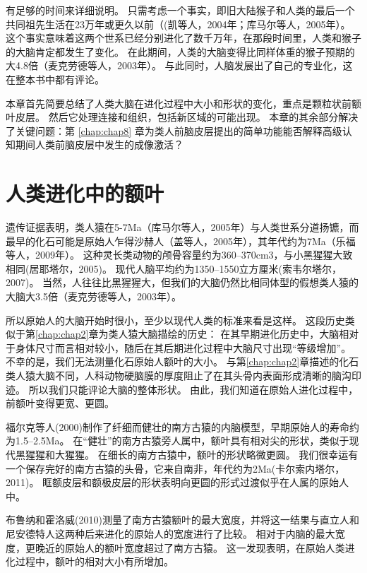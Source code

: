 有足够的时间来详细说明。
只需考虑一个事实，即旧大陆猴子和人类的最后一个共同祖先生活在23万年或更久以前（(凯等人，2004年；库马尔等人，2005年）。
这个事实意味着这两个世系已经分别进化了数千万年，在那段时间里，人类和猴子的大脑肯定都发生了变化。
在此期间，人类的大脑变得比同样体重的猴子预期的大4.8倍（麦克劳德等人，2003年）。
与此同时，人脑发展出了自己的专业化，这在整本书中都有评论。
\par


本章首先简要总结了人类大脑在进化过程中大小和形状的变化，重点是颗粒状前额叶皮层。
然后它处理连接和组织，包括新区域的可能出现。
本章的其余部分解决了关键问题：第 \ref{chap:chap8} 章为类人前脑皮层提出的简单功能能否解释高级认知期间人类前脑皮层中发生的成像激活？



\section{人类进化中的额叶}

遗传证据表明，类人猿在5-7Ma（库马尔等人，2005年）与人类世系分道扬镳，而最早的化石可能是原始人乍得沙赫人（盖等人，2005年），其年代约为7Ma（乐福等人，2009年）。
这种灵长类动物的颅骨容量约为360–370cm3，与小黑猩猩大致相同(居耶塔尔，2005)。
现代人脑平均约为1350–1550立方厘米(索韦尔塔尔，2007)。
当然，人往往比黑猩猩大，但我们的大脑仍然比相同体型的假想类人猿的大脑大3.5倍（麦克劳德等人，2003年）。
\par



所以原始人的大脑开始时很小，至少以现代人类的标准来看是这样。
这段历史类似于第\ref{chap:chap2}章为类人猿大脑描绘的历史：
在其早期进化历史中，大脑相对于身体尺寸而言相对较小，随后在其后期进化过程中大脑尺寸出现“等级增加”。
不幸的是，我们无法测量化石原始人额叶的大小。
与第\ref{chap:chap2}章描述的化石类人猿大脑不同，人科动物硬脑膜的厚度阻止了在其头骨内表面形成清晰的脑沟印迹。
所以我们只能评论大脑的整体形状。
由此，我们知道在原始人进化过程中，前额叶变得更宽、更圆。
\par


福尔克等人(2000)制作了纤细而健壮的南方古猿的内脑模型，早期原始人的寿命约为1.5–2.5Ma。
在“健壮”的南方古猿旁人属中，额叶具有相对尖的形状，类似于现代黑猩猩和大猩猩。
在细长的南方古猿中，额叶的形状略微更圆。
我们很幸运有一个保存完好的南方古猿的头骨，它来自南非，年代约为2Ma(卡尔索内塔尔，2011)。
眶额皮层和额极皮层的形状表明向更圆的形式过渡似乎在人属的原始人中。
\par


布鲁纳和霍洛威(2010)测量了南方古猿额叶的最大宽度，并将这一结果与直立人和尼安德特人这两种后来进化的原始人的宽度进行了比较。
相对于内脑的最大宽度，更晚近的原始人的额叶宽度超过了南方古猿。
这一发现表明，在原始人类进化过程中，额叶的相对大小有所增加。
\par


